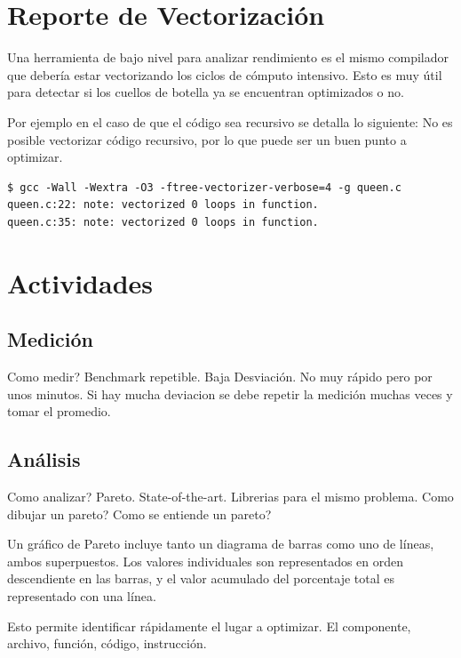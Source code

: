 \documentclass[a4paper]{report}
\begin{document}
\section{Reporte de Vectorizaci\'on}

Una herramienta de bajo nivel para analizar rendimiento es el mismo compilador
que deber\'ia estar vectorizando los ciclos de c\'omputo intensivo. Esto es muy
\'util para detectar si los cuellos de botella ya se encuentran optimizados o no.

\bigskip

Por ejemplo en el caso de que el c\'odigo sea recursivo se detalla lo siguiente:
No es posible vectorizar c\'odigo recursivo, por lo que puede ser un buen punto a
optimizar.

{\small
\begin{verbatim}
$ gcc -Wall -Wextra -O3 -ftree-vectorizer-verbose=4 -g queen.c
queen.c:22: note: vectorized 0 loops in function.
queen.c:35: note: vectorized 0 loops in function.
\end{verbatim}
}

\section{Actividades}

\subsection{Medici\'on}

Como medir? Benchmark repetible. Baja Desviaci\'on. No muy r\'apido pero por unos
minutos. Si hay mucha deviacion se debe repetir la medici\'on muchas veces y
tomar el promedio.

\subsection{An\'alisis}

Como analizar? Pareto. State-of-the-art. Librerias para el mismo problema.
Como dibujar un pareto? Como se entiende un pareto?

Un gr\'afico de Pareto incluye tanto un diagrama de barras como uno de l\'ineas, ambos superpuestos.
Los valores individuales son representados en orden descendiente en las barras, y el valor acumulado del porcentaje total es representado con una l\'inea.

Esto permite identificar r\'apidamente el lugar a optimizar. El componente, archivo, funci\'on, c\'odigo, instrucci\'on.
\end{document}
